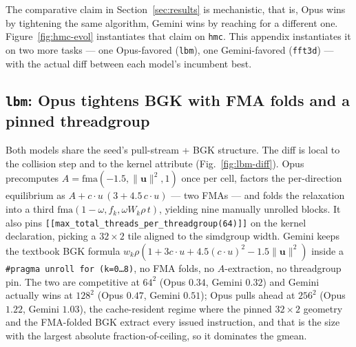 \documentclass{article}
\theoremstyle{plain}
\theoremstyle{definition}
\theoremstyle{remark}
\begin{document}
The comparative claim in Section~\ref{sec:results} is mechanistic, that is, Opus
wins by tightening the same algorithm, Gemini wins by reaching for a
different one. Figure~\ref{fig:hmc-evol} instantiates that claim on \texttt{hmc}.
This appendix instantiates it on two more tasks --- one Opus-favored
(\texttt{lbm}), one Gemini-favored (\texttt{fft3d}) --- with the actual diff between each
model's incumbent best.

\subsection{\texttt{lbm}: Opus tightens BGK with FMA folds and a pinned threadgroup}

Both models share the seed's pull-stream + BGK structure. The diff is
local to the collision step and to the kernel attribute
(Fig.~\ref{fig:lbm-diff}). Opus precomputes
$A=\mathrm{fma}(-1.5,\|\mathbf{u}\|^2,1)$ once per cell, factors the
per-direction equilibrium as $A + c{\cdot}u\,(3 + 4.5\,c{\cdot}u)$ ---
two FMAs --- and folds the relaxation into a third
$\mathrm{fma}(1{-}\omega, f_k, \omega W_k\rho\,t)$, yielding nine
manually unrolled blocks. It also pins
\texttt{[[max\_total\_threads\_per\_threadgroup(64)]]} on the kernel
declaration, picking a $32{\times}2$ tile aligned to the simdgroup
width. Gemini keeps the textbook BGK formula
$w_k\rho(1{+}3c{\cdot}u{+}4.5(c{\cdot}u)^2{-}1.5\|\mathbf{u}\|^2)$
inside a \texttt{\#pragma unroll for (k=0\ldots 8)}, no FMA folds, no
$A$-extraction, no threadgroup pin. The two are competitive at
$64^2$ (Opus $0.34$, Gemini $0.32$) and Gemini actually wins at $128^2$
(Opus $0.47$, Gemini $0.51$); Opus pulls ahead at $256^2$
(Opus $1.22$, Gemini $1.03$), the cache-resident regime where the pinned
$32{\times}2$ geometry and the FMA-folded BGK extract every issued
instruction, and that is the size with the largest absolute
fraction-of-ceiling, so it dominates the gmean.
\end{document}
